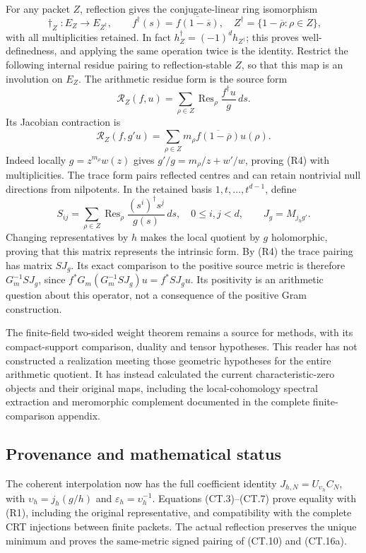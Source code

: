 For any packet \(Z\), reflection gives the conjugate-linear ring
isomorphism
\[
 \dagger_Z:E_Z\longrightarrow E_{Z^\dagger},\qquad
 f^\dagger(s)=\overline{f(1-\overline s)},\quad
 Z^\dagger=\{1-\overline\rho:\rho\in Z\},
\]
with all multiplicities retained. In fact
\(h_Z^\dagger=(-1)^dh_{Z^\dagger}\); this proves well-definedness,
and applying the same operation twice is the identity. Restrict
the following internal residue pairing to reflection-stable
\(Z\), so that this map is an involution on \(E_Z\).
The arithmetic residue form is the source form
\[
 \mathcal R_Z(f,u)=\sum_{\rho\in Z}
             \operatorname{Res}_\rho\frac{f^\dagger u}{g}\,ds .
\]
Its Jacobian contraction is
\[
 \mathcal R_Z(f,g'u)
 =\sum_{\rho\in Z}m_\rho\overline{f(1-\overline\rho)}u(\rho).
 \tag{R4}
\]
Indeed locally \(g=z^{m_\rho}w(z)\) gives
\(g'/g=m_\rho/z+w'/w\), proving (R4) with multiplicities.
The trace form pairs reflected centres and can retain
nontrivial null directions from nilpotents.
In the retained basis \(1,t,\ldots,t^{d-1}\), define
\[
 S_{ij}=\sum_{\rho\in Z}\operatorname{Res}_\rho
       \frac{(s^i)^\dagger s^j}{g(s)}\,ds,
 \quad 0\leq i,j<d,\qquad J_g=M_{j_hg'}.
\]
Changing representatives by \(h\) makes the local quotient by
\(g\) holomorphic, proving that this matrix represents the
intrinsic form. By (R4) the trace pairing has matrix \(SJ_g\).
Its exact comparison to the positive source metric is therefore
\(G_m^{-1}SJ_g\), since
\(f^*G_m(G_m^{-1}SJ_g)u=f^*SJ_gu\).
Its positivity is an arithmetic question about this operator,
not a consequence of the positive Gram construction.

The finite-field two-sided weight theorem remains a source for
methods, with its compact-support comparison, duality and
tensor hypotheses. This reader has not constructed a realization
meeting those geometric hypotheses for the entire arithmetic
quotient. It has instead calculated the current characteristic-zero
objects and their original maps, including the local-cohomology
spectral extraction and meromorphic complement documented in
the complete finite-comparison appendix.

\subsection{Provenance and mathematical status}
The coherent interpolation now has the full coefficient identity
\(J_{h,N}=U_{\upsilon_h}C_N\), with
\(\upsilon_h=j_h(g/h)\) and \(\varepsilon_h=\upsilon_h^{-1}\).
Equations (CT.3)--(CT.7) prove equality with (R1), including the
original representative, and compatibility with the complete CRT
injections between finite packets.  The actual reflection preserves
the unique minimum and proves the same-metric signed pairing of
(CT.10) and (CT.16a).

